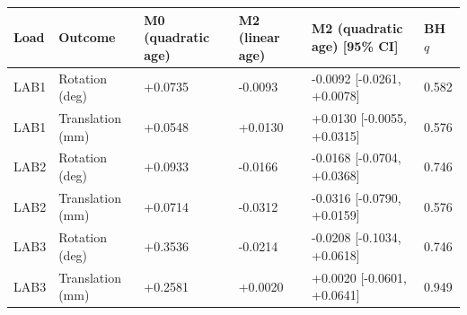 \begin{tabular}{llllll}
\toprule
Load & Outcome & M0 (quadratic age) & M2 (linear age) & M2 (quadratic age) [95\% CI] & BH $q$ \\
\midrule
LAB1 & Rotation (deg) & +0.0735 & -0.0093 & -0.0092 [-0.0261, +0.0078] & 0.582 \\
LAB1 & Translation (mm) & +0.0548 & +0.0130 & +0.0130 [-0.0055, +0.0315] & 0.576 \\
LAB2 & Rotation (deg) & +0.0933 & -0.0166 & -0.0168 [-0.0704, +0.0368] & 0.746 \\
LAB2 & Translation (mm) & +0.0714 & -0.0312 & -0.0316 [-0.0790, +0.0159] & 0.576 \\
LAB3 & Rotation (deg) & +0.3536 & -0.0214 & -0.0208 [-0.1034, +0.0618] & 0.746 \\
LAB3 & Translation (mm) & +0.2581 & +0.0020 & +0.0020 [-0.0601, +0.0641] & 0.949 \\
\bottomrule
\end{tabular}
